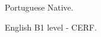 

\begin{cvskills}

  \cvskill
    {Portuguese} %
    {Native.} %

  \cvskill
    {English} %
    {B1 level - CERF.} %
    


\end{cvskills}





